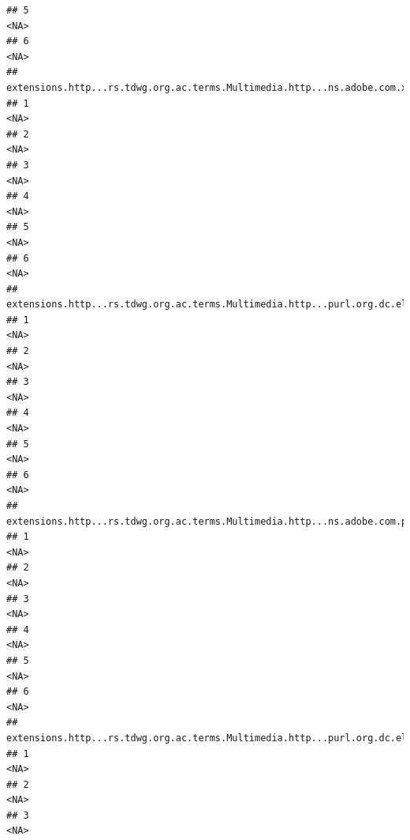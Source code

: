 \documentclass[
]{book}
\begin{document}
\begin{verbatim}
## 5                                                                                <NA>
## 6                                                                                <NA>
##   extensions.http...rs.tdwg.org.ac.terms.Multimedia.http...ns.adobe.com.xap.1.0.rights.Owner.2
## 1                                                                                         <NA>
## 2                                                                                         <NA>
## 3                                                                                         <NA>
## 4                                                                                         <NA>
## 5                                                                                         <NA>
## 6                                                                                         <NA>
##   extensions.http...rs.tdwg.org.ac.terms.Multimedia.http...purl.org.dc.elements.1.1.format.2
## 1                                                                                       <NA>
## 2                                                                                       <NA>
## 3                                                                                       <NA>
## 4                                                                                       <NA>
## 5                                                                                       <NA>
## 6                                                                                       <NA>
##   extensions.http...rs.tdwg.org.ac.terms.Multimedia.http...ns.adobe.com.photoshop.1.0.Credit.2
## 1                                                                                         <NA>
## 2                                                                                         <NA>
## 3                                                                                         <NA>
## 4                                                                                         <NA>
## 5                                                                                         <NA>
## 6                                                                                         <NA>
##   extensions.http...rs.tdwg.org.ac.terms.Multimedia.http...purl.org.dc.elements.1.1.creator.2
## 1                                                                                        <NA>
## 2                                                                                        <NA>
## 3                                                                                        <NA>

\end{verbatim}
\end{document}
